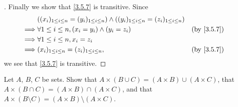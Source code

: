 \begin{proof}[]
	Finally we show that \cref{3.5.7} is transitive.
	Since
	\begin{align*}
		         & \pa{(x_i)_{1 \leq i \leq n} = (y_i)_{1 \leq i \leq n}} \land \pa{(y_i)_{1 \leq i \leq n} = (z_i)_{1 \leq i \leq n}}                 \\
		\implies & \forall 1 \leq i \leq n, (x_i = y_i) \land (y_i = z_i)                                                              &  & \by{3.5.7} \\
		\implies & \forall 1 \leq i \leq n, x_i = z_i                                                                                                  \\
		\implies & (x_i)_{1 \leq i \leq n} = (z_i)_{1 \leq i \leq n},                                                                  &  & \by{3.5.7}
	\end{align*}
	we see that \cref{3.5.7} is transitive.
\end{proof}

\begin{ex}\label{ex:3.5.4}
	Let \(A\), \(B\), \(C\) be sets.
	Show that \(A \times (B \cup C) = (A \times B) \cup (A \times C)\), that \(A \times (B \cap C) = (A \times B) \cap (A \times C)\), and that \(A \times (B \setminus C) = (A \times B) \setminus (A \times C)\).
\end{ex}

